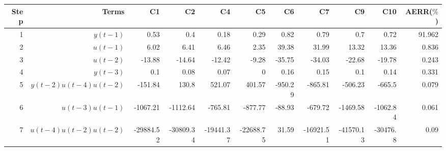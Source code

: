 \begin{tabular}{rrrrrrrrrrr}
Step & Terms & C1 & C2 & C4 & C5 & C6 & C7 & C9 & C10 & AERR($\%$) \\ 
\hline 
1 & $y(t-1)$ & 0.53 & 0.4 & 0.18 & 0.29 & 0.82 & 0.79 & 0.7 & 0.72 & 91.962 \\ 
2 & $u(t-1)$ & 6.02 & 6.41 & 6.46 & 2.35 & 39.38 & 31.99 & 13.32 & 13.36 & 0.836 \\ 
3 & $u(t-2)$ & -13.88 & -14.64 & -12.42 & -9.28 & -35.75 & -34.03 & -22.68 & -19.78 & 0.243 \\ 
4 & $y(t-3)$ & 0.1 & 0.08 & 0.07 & 0 & 0.16 & 0.15 & 0.1 & 0.14 & 0.331 \\ 
5 & $y(t-2)u(t-4)u(t-2)$ & -151.84 & 130.8 & 521.07 & 401.57 & -950.29 & -865.81 & -506.23 & -665.5 & 0.079 \\ 
6 & $u(t-3)u(t-1)$ & -1067.21 & -1112.64 & -765.81 & -877.77 & -88.93 & -679.72 & -1469.58 & -1062.84 & 0.061 \\ 
7 & $u(t-4)u(t-2)u(t-2)$ & -29884.52 & -30809.34 & -19441.37 & -22688.75 & 31.59 & -16921.51 & -41570.13 & -30476.8 & 0.09 \\ 
\hline 
\end{tabular}